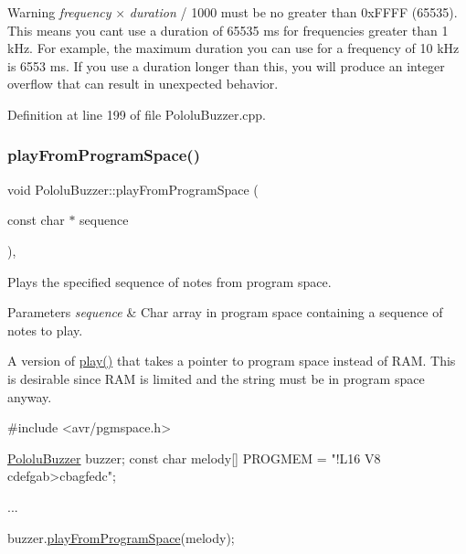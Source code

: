 \begin{DoxyWarning}{Warning}
{\itshape frequency} {$\times$} {\itshape duration} / 1000 must be no greater than 0x\+F\+F\+FF (65535). This means you can\textquotesingle{}t use a duration of 65535 ms for frequencies greater than 1 k\+Hz. For example, the maximum duration you can use for a frequency of 10 k\+Hz is 6553 ms. If you use a duration longer than this, you will produce an integer overflow that can result in unexpected behavior. 
\end{DoxyWarning}


Definition at line 199 of file Pololu\+Buzzer.\+cpp.

\mbox{\label{class_pololu_buzzer_a07ff4e9d9f7e4f37a58e149640b61f4e}} 
\subsubsection{\texorpdfstring{play\+From\+Program\+Space()}{playFromProgramSpace()}}
{\footnotesize\ttfamily void Pololu\+Buzzer\+::play\+From\+Program\+Space (\begin{DoxyParamCaption}\item[{const char $\ast$}]{sequence }\end{DoxyParamCaption})\hspace{0.3cm}{\ttfamily [static]}, {\ttfamily [inherited]}}



Plays the specified sequence of notes from program space. 


\begin{DoxyParams}{Parameters}
{\em sequence} & Char array in program space containing a sequence of notes to play.\\
\hline
\end{DoxyParams}
A version of {\ttfamily \hyperlink{class_pololu_buzzer_a22f45ef7cdf9dc8fc54e617244368277}{play()}} that takes a pointer to program space instead of R\+AM. This is desirable since R\+AM is limited and the string must be in program space anyway.


\begin{DoxyCode}
\textcolor{preprocessor}{#include <avr/pgmspace.h>}

\hyperlink{class_pololu_buzzer}{PololuBuzzer} buzzer;
\textcolor{keyword}{const} \textcolor{keywordtype}{char} melody[] PROGMEM = \textcolor{stringliteral}{"!L16 V8 cdefgab>cbagfedc"};

...

buzzer.\hyperlink{class_pololu_buzzer_a07ff4e9d9f7e4f37a58e149640b61f4e}{playFromProgramSpace}(melody);
\end{DoxyCode}
 

